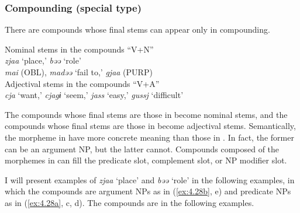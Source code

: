 \subsubsection{Compounding (special type)}\label{bkm:Ref364279917}\hypertarget{RefHeadingToc395697005}{}
There are compounds whose final stems can appear only in compounding.

\ea\label{ex:4.27}
\ea\label{ex:4.27a} Nominal stems in the compounds “V+N”\\
\ea\label{ex:4.27a-1} \textit{zjaa} ‘place,’ \textit{bəə} ‘role’\\
\ex\label{ex:4.27a-2} \textit{mai} (OBL), \textit{madəə} ‘fail to,’ \textit{gjaa} (PURP)\\
\z
\ex\label{ex:4.27b} Adjectival stems in the compounds “V+A”\\
\textit{cja} ‘want,’ \textit{cjagɨ} ‘seem,’ \textit{jass} ‘easy,’ \textit{gussj} ‘difficult’
\z
\z

\noindent The compounds whose final stems are those in  become nominal stems, and the compounds whose final stems are those in  become adjectival stems. Semantically, the morpheme in  have more concrete meaning than those in . In fact, the former can be an argument NP, but the latter cannot. Compounds composed of the morphemes in  can fill the predicate slot, complement slot, or NP modifier slot.

I will present examples of \textit{zjaa} ‘place’ and \textit{bəə} ‘role’ in the following examples, in which the compounds are argument NPs as in (\ref{ex:4.28b}, e) and predicate NPs as in (\ref{ex:4.28a}, c, d). The compounds are \EmphName in the following examples.

